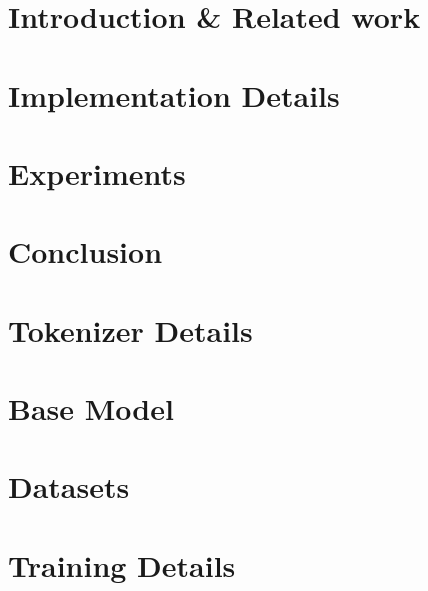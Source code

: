 \documentclass{article}
\begin{document}
\section{Introduction \& Related work}
\label{sec:intro}



\section{Implementation Details}
\label{sec:methods}



\section{Experiments}
\label{sec:experiments}


\section{Conclusion}
\label{sec:conclusion}








\newpage
\appendix

\section{Tokenizer Details}
\label{sec:tokenizer}


\section{Base Model}
\label{base_model}


\section{Datasets}
\label{sec:dataset_details}


\section{Training Details}
\label{sec:training_details}

\end{document}
